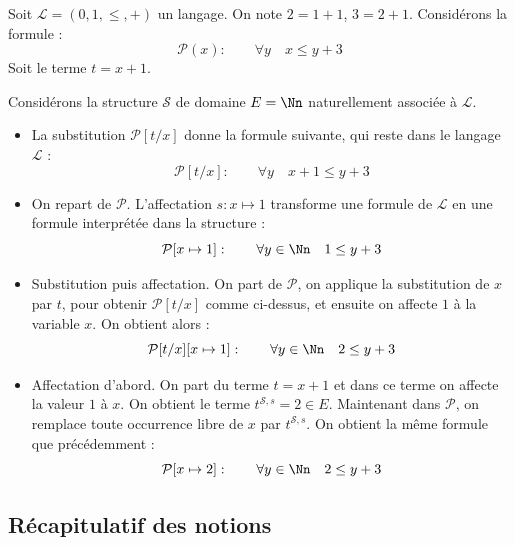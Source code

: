 \documentclass[11pt,class=report,crop=false]{standalone}
\begin{document}
\begin{exemple}
Soit $\mathcal{L} = (0,1, \le, +)$ un langage.
On note $2=1+1$, $3=2+1$. Considérons la formule :
\[
\mathcal{P}(x) : \qquad \forall y \quad x \le y + 3
\]
Soit le terme $t = x+1$.

Considérons la structure $\mathcal{S}$ de domaine $E = \Nn$ naturellement associée à $\mathcal{L}$. 


\begin{itemize}
	\item La substitution $\mathcal{P}[t/x]$ donne la formule suivante, qui reste dans le langage $\mathcal{L}$ :
	\[
	\mathcal{P}[t/x] : \qquad \forall y \quad x+1 \le y + 3
	\]
	
	\item On repart de $\mathcal{P}$. L'affectation $s : x \mapsto 1$ transforme une formule de $\mathcal{L}$ en une formule interprétée dans la structure :
	\[
	\mathcal{P}[x \mapsto 1] : \qquad \forall y \in \Nn  \quad 1 \le y + 3
	\]	
	
	
	\item Substitution puis affectation.
	On part de $\mathcal{P}$, on applique la substitution de $x$ par $t$, pour obtenir $\mathcal{P}[t/x]$ comme ci-dessus, et ensuite on affecte $1$ à la variable $x$. On obtient alors :
	\[
	\mathcal{P}[t/x][x \mapsto 1] : \qquad \forall y \in \Nn \quad 2 \le y + 3
	\]	
	
	\item Affectation d'abord.
	On part du terme $t=x+1$ et dans ce terme on affecte la valeur $1$ à $x$. On obtient le terme $t^{\mathcal{S},s} = 2 \in E$. Maintenant dans $\mathcal{P}$, on remplace toute occurrence libre de $x$ par $t^{\mathcal{S},s}$. On obtient la même formule que précédemment :
	\[
	\mathcal{P}[x \mapsto 2] : \qquad \forall y \in \Nn \quad 2 \le y + 3
	\]		
	
\end{itemize}

\end{exemple}


\subsection{Récapitulatif des notions}
\end{document}
